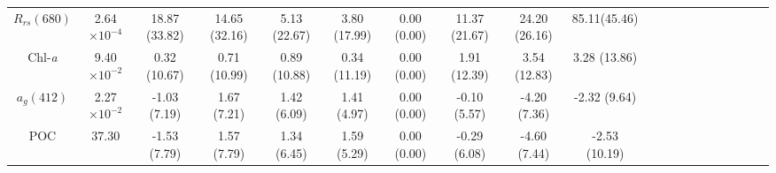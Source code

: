 \documentclass[preview]{standalone}
\begin{document}
\begin{threeparttable}
\begin{tabular}{@{\extracolsep{4pt}}Sc ccccccccc ccccccccc@{}}
$R_{rs}(680)$ 	& 2.64$\times10^{-4}$	& 18.87 (33.82)& 14.65 (32.16)& 5.13 (22.67)& 3.80 (17.99)& 0.00 (0.00) & 11.37 (21.67)& 24.20 (26.16)& 85.11(45.46) 	\\
Chl-\it{a}    	& 9.40$\times10^{-2}$ 	&  0.32 (10.67)& 0.71 (10.99)& 0.89 (10.88)& 0.34 (11.19)& 0.00 (0.00) & 1.91 (12.39)& 3.54 (12.83)& 3.28 (13.86) 		\\ 
$a_{g}(412)$  	& 2.27$\times10^{-2}$ & -1.03 (7.19)& 1.67 (7.21)& 1.42 (6.09)& 1.41 (4.97)& 0.00 (0.00)& -0.10 (5.57)& -4.20 (7.36)& -2.32 (9.64) 	\\ 
POC	       	&  37.30 &  -1.53 (7.79) & 1.57 (7.79) & 1.34 (6.45) & 1.59 (5.29) & 0.00 (0.00) & -0.29 (6.08) & -4.60 (7.44) & -2.53 (10.19)					\\ %


\end{tabular}
\end{threeparttable}
\end{document}
